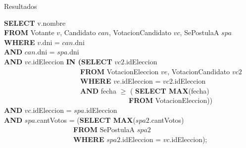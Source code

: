 \begin{section}{Resultados}

\begin{footnotesize} 
\begin{tt} 
\begin{tabbing} 


\textbf{SELECT} v.nombre \\
\textbf{FROM} Votante $v$, Candidato $can$, VotacionCandidato $vc$, SePostulaA $spa$ \\
\textbf{WHERE} $v$.dni = $can$.dni \\
\textbf{AND} $can$.dni = $spa$.dni \\
\textbf{AND} $vc$.idEleccion \textbf{IN (SELECT} $vc2$.idEleccion \\
\ \ \ \ \ \ \ \ \ \ \ \ \ \ \ \ \ \ \ \ \ \ \textbf{FROM} VotacionEleccion $ve$, VotacionCandidato $vc2$ \\
\ \ \ \ \ \ \ \ \ \ \ \ \ \ \ \ \ \ \ \ \ \ \textbf{WHERE} $ve$.idEleccion = $vc2$.idEleccion \\
\ \ \ \ \ \ \ \ \ \ \ \ \ \ \ \ \ \ \ \ \ \ \textbf{AND} fecha $\geq$ ( \textbf{SELECT MAX}(fecha) \\
\ \ \ \ \ \ \ \ \ \ \ \ \ \ \ \ \ \ \ \ \ \ \ \ \ \ \ \ \ \ \ \ \ \ \ \ \textbf{FROM} VotacionEleccion)) \\
\textbf{AND} $vc$.idEleccion = $spa$.idEleccion \\
\textbf{AND} $spa$.cantVotos = (\textbf{SELECT MAX}($spa2$.cantVotos) \\
\ \ \ \ \ \ \ \ \ \ \ \ \ \ \ \ \ \ \ \ \textbf{FROM} SePostulaA $spa2$ \\
\ \ \ \ \ \ \ \ \ \ \ \ \ \ \ \ \ \ \ \ \textbf{WHERE} $spa2$.idEleccion = $vc$.idEleccion); \\
\end{tabbing} 
\end{tt} 
\end{footnotesize} 

\end{section}
